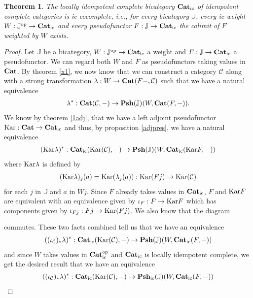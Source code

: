 \documentclass[12pt,oneside,reqno,a4paper]{article}
\newtheorem{theorem}{Theorem}[section]
\theoremstyle{definition}
\newcommand{\op}{^\textup{op}}
\newcommand{\Cat}{\textbf{\textup{Cat}}}
\newcommand{\Catic}{\textbf{\textup{Cat}}_\textup{ic}}
\newcommand{\Psh}[1]{\textbf{\textup{Psh}}(#1)}
\newcommand{\Pshic}[1]{\textbf{\textup{Psh}}_\textup{ic}(#1)}
\newcommand{\Kar}[1]{\textup{Kar}(#1)}
\newcommand{\Kartwo}{\textup{Kar}}
\newcommand{\C}{\mathcal{C}}
\newcommand{\bJ}{\mathbb{J}}
\begin{document}
\begin{theorem} \label{x2}
The locally idempotent complete bicategory $\Catic$ of idempotent complete categories is ic-cocomplete, i.e., for every bicategory $\bJ$, every ic-weight $W:\bJ\op\to\Catic$ and every pseudofunctor $F:\bJ\to\Catic$ the colimit of $F$ weighted by $W$ exists.
\end{theorem}

\begin{proof}
Let $\bJ$ be a bicategory, $W:\bJ\op\to\Catic$ a weight and $F:\bJ\to\Catic$ a pseudofunctor. We can regard both $W$ and $F$ as pseudofunctors taking values in $\Cat$. By theorem \ref{x1}, we now know that we can construct a category $\C$ along with a strong transformation $\lambda:W\to\Cat(F-,\C)$ such that we have a natural equivalence
\begin{align*}
\lambda^* :\Cat(\C,-)\to \Psh{\bJ}(W,\Cat(F,-)).
\end{align*}
We know by theorem \ref{1adj}, that we have a left adjoint pseudofunctor $\Kartwo:\Cat\to\Catic$ and thus, by proposition \ref{adjpres}, we have a natural equivalence
\begin{align*}
(\Kartwo\lambda)^*:\Catic(\Kar{\C},-)\to\Psh{\bJ}(W,\Catic(\Kartwo F,-))
\end{align*}
where $\Kartwo\lambda$ is defined by
\begin{align*}
(\Kartwo\lambda)_j(a)=\Kar{\lambda_j(a)}:\Kar{Fj}\to\Kar{\C}
\end{align*}
for each $j$ in $\bJ$ and $a$ in $Wj$. Since $F$ already takes values in $\Catic$, $F$ and $\Kartwo F$ are equivalent with an equivalence given by $\iota_F:F\to \Kartwo F$ which has components given by $\iota_{Fj}:Fj\to \Kar{Fj}$. We also know that the diagram
\begin{center}
\end{center}
commutes. These two facts combined tell us that we have an equivalence
\begin{align*}
((\iota_\C)_*\lambda)^*: \Catic(\Kar{\C},-)\to \Psh{\bJ}(W,\Catic(F,-))
\end{align*}
and since $W$ takes values in $\Catic\op$ and $\Catic$ is locally idempotent complete, we get the desired result that we have an equivalence
\begin{align*}
((\iota_\C)_*\lambda)^*: \Catic(\Kar{\C},-)\to \Pshic{\bJ}(W,\Catic(F,-))
\end{align*}
\end{proof}
\end{document}
